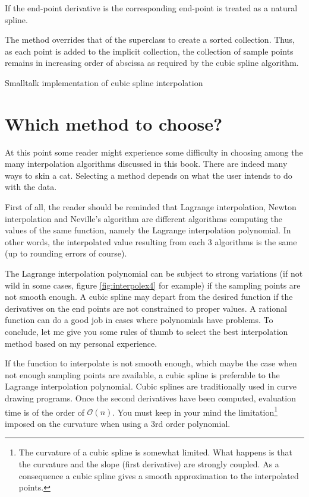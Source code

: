 If the end-point derivative is  the corresponding
end-point is treated as a natural spline.

The method  overrides that of the
superclass to create a sorted collection. Thus, as each point is
added to the implicit collection, the collection of sample points
remains in increasing order of abscissa as required by the cubic
spline algorithm.

\begin{listing}
  Smalltalk implementation of cubic spline interpolation
  \label{ls:spline}

\end{listing}


\section{Which method to choose?}
At this point some reader might experience some difficulty in
choosing among the many interpolation algorithms discussed in this
book. There are indeed many ways to skin a cat. Selecting a method
depends on what the user intends to do with the data.

First of all, the reader should be reminded that Lagrange
interpolation, Newton interpolation and Neville's algorithm are
different algorithms computing the values of the same function,
namely the Lagrange interpolation polynomial. In other words, the
interpolated value resulting from each 3 algorithms is the same
(up to rounding errors of course).

The Lagrange interpolation polynomial can be subject to strong
variations (if not wild in some cases, figure
\ref{fig:interpolex4} for example) if the sampling points are not
smooth enough. A cubic spline may depart from the desired function
if the derivatives on the end points are not constrained to proper
values. A rational function can do a good job in cases where
polynomials have problems. To conclude, let me give you some rules
of thumb to select the best interpolation method based on my
personal experience.

If the function to interpolate is not smooth enough, which maybe
the case when not enough sampling points are available, a cubic
spline is preferable to the Lagrange interpolation polynomial.
Cubic splines are traditionally used in curve drawing programs.
Once the second derivatives have been computed, evaluation time is
of the order of $\mathcal{O}(n)$.
You must keep in your mind the limitation\footnote{The curvature of a cubic spline is somewhat
limited. What happens is that the curvature and the slope (first
derivative) are strongly coupled. As a consequence a cubic spline
gives a smooth approximation to the interpolated points.} imposed
on the curvature when using a 3rd order polynomial.

